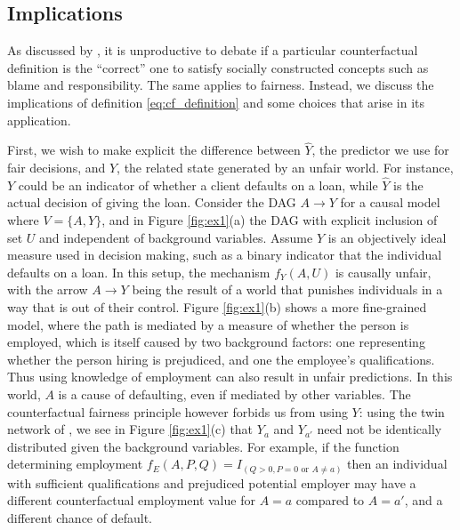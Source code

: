 \subsection{Implications}
%
As discussed by \citet{halpern:16}, it is unproductive to debate
if a particular counterfactual definition is the ``correct'' one
to satisfy socially constructed concepts such as blame and responsibility.
The same applies to fairness. Instead, we discuss the
implications of definition \eqref{eq:cf_definition} and some choices
that arise in its application.

First, we wish to make explicit the difference between $\hat Y$, the
predictor we use for fair decisions, and $Y$, the related state
generated by an unfair world. For instance, $Y$ could be an indicator
of whether a client defaults on a loan, while $\hat Y$ is the actual
decision of giving the loan. Consider the DAG $A \rightarrow Y$ for a
causal model where $V = \{A, Y\}$, and in Figure \ref{fig:ex1}(a) the
DAG with explicit inclusion of set $U$ and independent of background variables. Assume $Y$ is an objectively
ideal measure used in decision making, such as a binary
indicator that the individual defaults on a loan. In this setup, the mechanism $f_Y(A, U)$ is causally unfair, with the arrow
$A \rightarrow Y$ being the result of a world that punishes
individuals in a way that is out of their control. Figure
\ref{fig:ex1}(b) shows a more fine-grained  model, where
the path is mediated by a measure of whether the person is employed,
which is itself caused by two background factors: one representing
whether the person hiring is prejudiced, and one the employee's qualifications. Thus using knowledge of employment can also
result in unfair predictions.%
In this world,
$A$ is a cause of defaulting, even if mediated by other
variables. The counterfactual fairness principle however forbids us
from using $Y$: using the twin network of
\citet{pearl:00}, we see in Figure \ref{fig:ex1}(c) that $Y_a$ and
$Y_{a'}$ need not be identically distributed given the
background variables.
For example, if the function determining employment
$f_E(A,P,Q) = I_{(Q > 0, P = 0 \text{ or } A \neq a)}$ then an individual
with sufficient qualifications and prejudiced potential employer
may have a different counterfactual
employment value for $A = a$ compared to $A = a'$, and a different chance of default.


